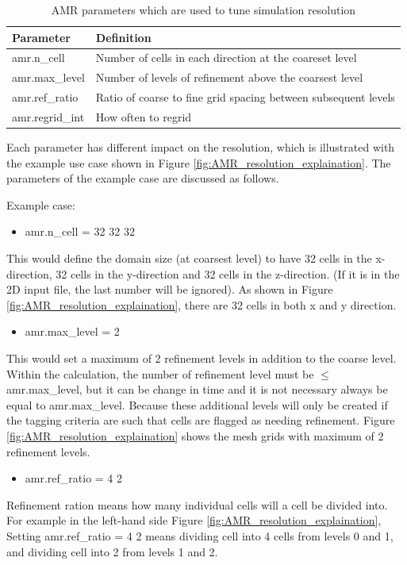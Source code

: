 \documentclass[10pt, conference, compsocconf]{IEEEtran}
\begin{document}
\begin{table}[H]
\begin{center}
\begin{tabular}{|l|l|}
	\hline
	\textbf{Parameter} & \textbf{Definition}\\ \hline
    amr.n\_cell & Number of cells in each direction at the coareset level\\ 		\hline
    amr.max\_level & Number of levels of refinement above the coarsest level\\
	\hline
    amr.ref\_ratio & Ratio of coarse to fine grid spacing between subsequent levels\\
    \hline
    amr.regrid\_int & How often to regrid\\
    \hline
\end{tabular}
\caption{AMR parameters which are used to tune simulation resolution}
\label{table:table_tune_resolution}
\end{center}
\end{table}

Each parameter has different impact on the resolution, which is illustrated with the example use case shown in Figure \ref{fig:AMR_resolution_explaination}. The parameters of the example case are discussed as follows.

Example case:
\begin{itemize}
\item amr.n\_cell = 32 32 32
\end{itemize}
This would define the domain size (at coarsest level) to have 32 cells in the x-direction, 32 cells in the y-direction and 32 cells in the z-direction. (If it is in the 2D input file, the last number will be ignored). As shown in Figure \ref{fig:AMR_resolution_explaination}, there are 32 cells in both x and y direction.

\begin{itemize}
\item amr.max\_level = 2
\end{itemize}
This would set a maximum of 2 refinement levels in addition to the coarse level. Within the calculation, the number of refinement level must be $\leqslant$ amr.max\_level, but it can be change in time and it is not necessary always be equal to amr.max\_level. Because these additional levels will only be created if the tagging criteria are such that cells are flagged as needing refinement. Figure \ref{fig:AMR_resolution_explaination} shows the mesh grids with maximum of 2 refinement levels.

\begin{itemize}
\item amr.ref\_ratio = 4 2
\end{itemize}
Refinement ration means how many individual cells will a cell be divided into. For example in the left-hand side Figure \ref{fig:AMR_resolution_explaination}, Setting amr.ref\_ratio = 4 2 means dividing cell into 4 cells from levels 0 and 1, and dividing cell into 2 from levels 1 and 2.
\end{document}
